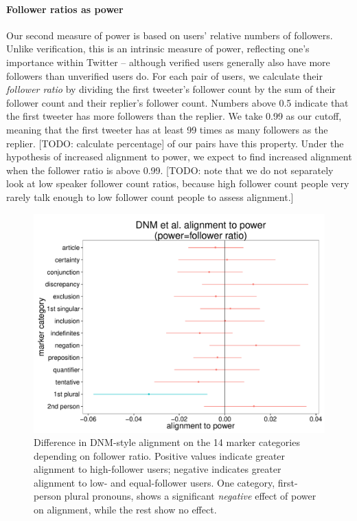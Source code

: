 \documentclass{acm_proc_article-sp}
\begin{document}
\paragraph{Follower ratios as power} Our second measure of power is based on users' relative numbers of followers.  Unlike verification, this is an intrinsic measure of power, reflecting one's importance within Twitter -- although verified users generally also have more followers than unverified users do. For each pair of users, we calculate their \textit{follower ratio} by dividing the first tweeter's follower count by the sum of their follower count and their replier's follower count.  Numbers above 0.5 indicate that the first tweeter has more followers than the replier.  We take 0.99 as our cutoff, meaning that the first tweeter has at least 99 times as many followers as the replier.  [TODO: calculate percentage] of our pairs have this property.  Under the hypothesis of increased alignment to power, we expect to find increased alignment when the follower ratio is above 0.99. [TODO: note that we do not separately look at low speaker follower count ratios, because high follower count people very rarely talk enough to low follower count people to assess alignment.]

\begin{figure}
\centering
\includegraphics[width=.9\columnwidth]{graphics/www2016_dnmpowerdiff_fratio.pdf}
\caption{Difference in DNM-style alignment on the 14 marker categories depending on follower ratio. Positive values indicate greater alignment to high-follower users; negative indicates greater alignment to low- and equal-follower users. One category, first-person plural pronouns, shows a significant \textit{negative} effect of power on alignment, while the rest show no effect.}\label{fig:dnm-fratio}
\end{figure}
\end{document}
